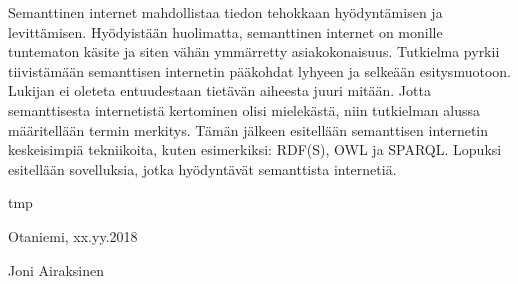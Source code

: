 \documentclass[finnish, 12pt, a4paper, elec, utf8, pdfa, online]{aaltothesis}
\date{23.4.2018}
\begin{document}
\makecoverpage

\makecopyrightpage

\begin{abstractpage}[finnish]
Semanttinen internet mahdollistaa tiedon tehokkaan hyödyntämisen ja levittämisen. Hyödyistään huolimatta, semanttinen internet on monille tuntematon käsite ja siten vähän ymmärretty asiakokonaisuus. Tutkielma pyrkii tiivistämään semanttisen internetin pääkohdat lyhyeen ja selkeään esitysmuotoon. Lukijan ei oleteta entuudestaan tietävän aiheesta juuri mitään. Jotta semanttisesta internetistä kertominen olisi mielekästä, niin tutkielman alussa määritellään termin merkitys. Tämän jälkeen esitellään semanttisen internetin keskeisimpiä tekniikoita, kuten esimerkiksi: RDF(S), OWL ja SPARQL. Lopuksi esitellään sovelluksia, jotka hyödyntävät semanttista internetiä.
\end{abstractpage}


\newpage





tmp

\vspace{5cm}
Otaniemi, xx.yy.2018

\vspace{5mm}
{\hfill Joni Airaksinen \hspace{1cm}}

\newpage
\end{document}
